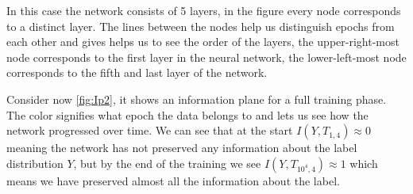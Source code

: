 \documentclass[dissertation.tex]{subfiles}
\begin{document}
In this case the network consists of 5 layers, in the figure every node
corresponds to a distinct layer. The lines between the nodes help us distinguish
epochs from each other and gives helps us to see the order of the layers, the
upper-right-most node corresponds to the first layer in the neural network, the
lower-left-most node corresponds to the fifth and last layer of the network.

Consider now \autoref{fig:Ip2}, it shows an information plane for a full
training phase. The color signifies what epoch the data belongs to and lets us
see how the network progressed over time. We can see that at the start $I(Y,
T_{1,4}) \approx 0$ meaning the network has not preserved any information about
the label distribution $Y$, but by the end of the training we see $I(Y,
T_{10^4,4}) \approx 1$ which means we have preserved almost all the information
about the label.
\end{document}
